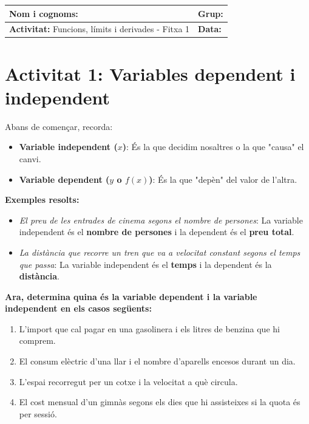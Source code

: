 \documentclass[12pt,a4paper]{article}
\begin{document}
\begingroup
\renewcommand{\arraystretch}{2.2}
\begin{tabularx}{\textwidth}{|X|p{4cm}|}
    \hline
    \textbf{Nom i cognoms:} & \textbf{Grup:} \\ \hline
    \textbf{Activitat:} Funcions, límits i derivades - Fitxa 1 & \textbf{Data:} \\ \hline
\end{tabularx}
\endgroup

\vspace{0.8cm}

\section*{Activitat 1: Variables dependent i independent}

Abans de començar, recorda:
\begin{itemize}
    \item \textbf{Variable independent ($x$)}: És la que decidim nosaltres o la que "causa" el canvi.
    \item \textbf{Variable dependent ($y$ o $f(x)$)}: És la que "depèn" del valor de l'altra.
\end{itemize}

\textbf{Exemples resolts:}
\begin{itemize}
    \item \textit{El preu de les entrades de cinema segons el nombre de persones}: La variable independent és el \textbf{nombre de persones} i la dependent és el \textbf{preu total}.
    \item \textit{La distància que recorre un tren que va a velocitat constant segons el temps que passa}: La variable independent és el \textbf{temps} i la dependent és la \textbf{distància}.
\end{itemize}

\textbf{Ara, determina quina és la variable dependent i la variable independent en els casos següents:}
\begin{enumerate}[label=\alph*)]
    \item L'import que cal pagar en una gasolinera i els litres de benzina que hi comprem.
    \item El consum elèctric d'una llar i el nombre d'aparells encesos durant un dia.
    \item L'espai recorregut per un cotxe i la velocitat a què circula.
    \item El cost mensual d'un gimnàs segons els dies que hi assisteixes si la quota és per sessió.
\end{enumerate}
\end{document}
